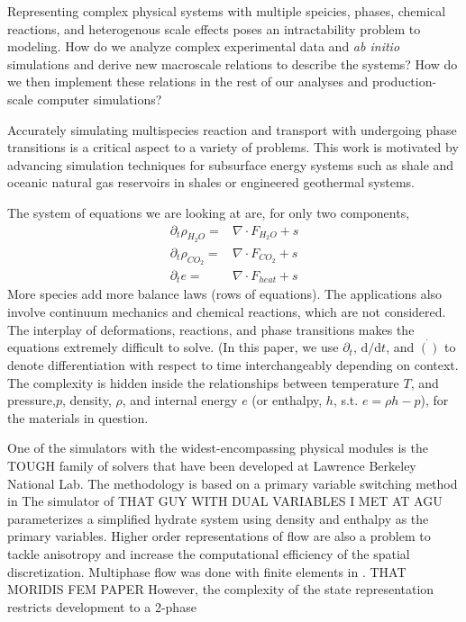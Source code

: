 \documentclass[]{article}
\begin{document}
Representing complex physical systems with multiple speicies, phases,
chemical reactions, and heterogenous scale effects poses an
intractability problem to modeling. How do we analyze complex
experimental data and \emph{ab initio} simulations and derive new
macroscale relations to describe the systems? How do we then implement
these relations in the rest of our analyses and production-scale
computer simulations?

Accurately simulating multispecies reaction and transport with
undergoing phase transitions is a critical aspect to a variety of
problems.
This work is motivated by advancing simulation techniques for subsurface energy systems such as shale
and oceanic natural gas reservoirs in shales or engineered geothermal
systems.


The system of equations we are looking at are, for only two components,
\begin{align}
  \partial_t \rho_{H_2O} =& \nabla \cdot F_{H_2O} + s \\
  \partial_t \rho_{CO_2} =& \nabla \cdot F_{CO_2} + s \\
  \partial_t e =& \nabla \cdot F_{heat} + s
\end{align}
More species add more balance laws (rows of equations). The applications also involve continuum
mechanics and chemical reactions, which are not considered. The interplay of deformations,
reactions, and phase transitions makes the equations extremely difficult
to solve. \cite{queiruga2018millstone}
(In this paper, we use $\partial_t$, $\mathrm{d}/\mathrm{d}t$,
and $\dot{()}$ to denote differentiation with respect to time
interchangeably depending on context.
The complexity is hidden inside the relationships between temperature
$T$, and pressure,$p$, density, $\rho$, and internal energy $e$ (or
enthalpy, $h$, s.t. $e=\rho h - p$), 
for the materials in question.

One of the simulators with the widest-encompassing physical modules is
the TOUGH family of solvers that have been developed at Lawrence
Berkeley National Lab.
The methodology is based on a primary variable switching method in 
The simulator of THAT GUY WITH DUAL VARIABLES I MET AT AGU
parameterizes a simplified hydrate system using density and enthalpy
as the primary variables.
Higher order representations of flow are also a problem to tackle
anisotropy and increase the computational efficiency of the spatial
discretization\cite{hannon_enhanced_2018}. 
Multiphase flow was done with finite elements in \cite{yang_fully_2014}.
THAT MORIDIS FEM PAPER
However, the complexity of the state representation restricts
development to a 2-phase
\end{document}
